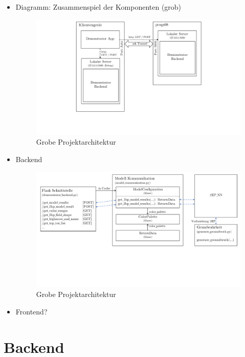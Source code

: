 \documentclass[a4paper]{extarticle}
\begin{document}
    \begin{itemize}
        \item Diagramm: Zusammenspiel der Komponenten (grob)
        \begin{figure}[H]
            \centering
            \includegraphics[trim={5cm 3.5cm 5cm 0}, clip, width=0.8\linewidth]{bilder/architektur_projekt.pdf}
            \caption{Grobe Projektarchitektur} \label{fig:architektur-projekt}
        \end{figure}
        \item Backend
        \begin{figure}[H]
            \centering
            \includegraphics[trim={0cm 6cm 0cm 0}, clip, width=\linewidth]{bilder/architektur_backend.pdf}
            \caption{Grobe Projektarchitektur} \label{fig:architektur-backend}
        \end{figure}
        \item Frontend?
    \end{itemize}

    \section{Backend}
\end{document}
